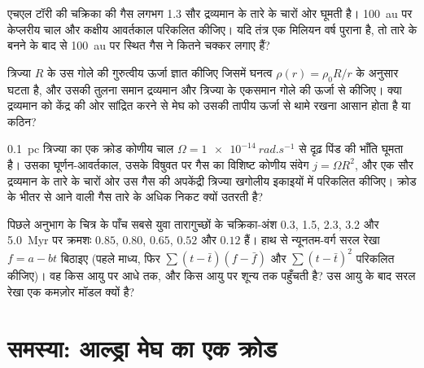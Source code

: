 \begin{exercise}[$\star\star$]\label{exo:b2:ism-star-formation:9}
एचएल टॉरी की चक्रिका की गैस लगभग \num{1.3} सौर द्रव्यमान के तारे के चारों ओर
घूमती है। \qty{100}{au} पर केप्लरीय चाल और कक्षीय आवर्तकाल परिकलित कीजिए।
यदि तंत्र एक मिलियन वर्ष पुराना है, तो तारे के बनने के बाद से \qty{100}{au} पर स्थित
गैस ने कितने चक्कर लगाए हैं?
\end{exercise}

\begin{exercise}[$\star\star\star$]\label{exo:b2:ism-star-formation:10}
त्रिज्या $R$ के उस गोले की गुरुत्वीय ऊर्जा ज्ञात कीजिए जिसमें घनत्व
$\rho(r) = \rho_0 R/r$ के अनुसार घटता है, और उसकी तुलना समान द्रव्यमान और त्रिज्या के
एकसमान गोले की ऊर्जा से कीजिए। क्या द्रव्यमान को केंद्र की ओर सांद्रित करने से
मेघ को उसकी तापीय ऊर्जा से थामे रखना आसान होता है या कठिन?
\end{exercise}

\begin{exercise}[$\star\star\star$]\label{exo:b2:ism-star-formation:11}
\qty{0.1}{pc} त्रिज्या का एक क्रोड कोणीय चाल
$\Omega = \qty{1e-14}{rad.s^{-1}}$ से दृढ़ पिंड की भाँति घूमता है। उसका घूर्णन-आवर्तकाल, उसके
विषुवत पर गैस का विशिष्ट कोणीय संवेग $j = \Omega R^2$, और एक सौर द्रव्यमान के तारे के चारों ओर उस
गैस की अपकेंद्री त्रिज्या खगोलीय इकाइयों में परिकलित कीजिए।
क्रोड के भीतर से आने वाली गैस तारे के अधिक निकट क्यों उतरती है?
\end{exercise}

\begin{exercise}[$\star\star\star$]\label{exo:b2:ism-star-formation:12}
पिछले अनुभाग के चित्र के पाँच सबसे युवा तारागुच्छों के चक्रिका-अंश
0.3, 1.5, 2.3, 3.2 और \qty{5.0}{Myr} पर क्रमशः $0.85$, $0.80$, $0.65$, $0.52$ और $0.12$ हैं।
हाथ से न्यूनतम-वर्ग सरल रेखा $f = a - bt$ बिठाइए
(पहले माध्य, फिर $\sum(t - \bar t)(f - \bar f)$ और
$\sum(t - \bar t)^2$ परिकलित कीजिए)। वह किस आयु पर आधे तक, और किस आयु पर शून्य तक पहुँचती है? उस आयु के बाद
सरल रेखा एक कमज़ोर मॉडल क्यों है?
\end{exercise}

\section{समस्या: आल्ड्रा मेघ का एक क्रोड}

